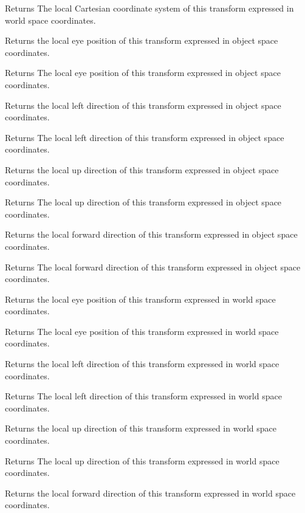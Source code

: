 \begin{DoxyReturn}{Returns}
The local Cartesian coordinate system of this transform expressed in world space coordinates.
\end{DoxyReturn}
Returns the local eye position of this transform expressed in object space coordinates.

\begin{DoxyReturn}{Returns}
The local eye position of this transform expressed in object space coordinates.
\end{DoxyReturn}
Returns the local left direction of this transform expressed in object space coordinates.

\begin{DoxyReturn}{Returns}
The local left direction of this transform expressed in object space coordinates.
\end{DoxyReturn}
Returns the local up direction of this transform expressed in object space coordinates.

\begin{DoxyReturn}{Returns}
The local up direction of this transform expressed in object space coordinates.
\end{DoxyReturn}
Returns the local forward direction of this transform expressed in object space coordinates.

\begin{DoxyReturn}{Returns}
The local forward direction of this transform expressed in object space coordinates.
\end{DoxyReturn}
Returns the local eye position of this transform expressed in world space coordinates.

\begin{DoxyReturn}{Returns}
The local eye position of this transform expressed in world space coordinates.
\end{DoxyReturn}
Returns the local left direction of this transform expressed in world space coordinates.

\begin{DoxyReturn}{Returns}
The local left direction of this transform expressed in world space coordinates.
\end{DoxyReturn}
Returns the local up direction of this transform expressed in world space coordinates.

\begin{DoxyReturn}{Returns}
The local up direction of this transform expressed in world space coordinates.
\end{DoxyReturn}
Returns the local forward direction of this transform expressed in world space coordinates.

